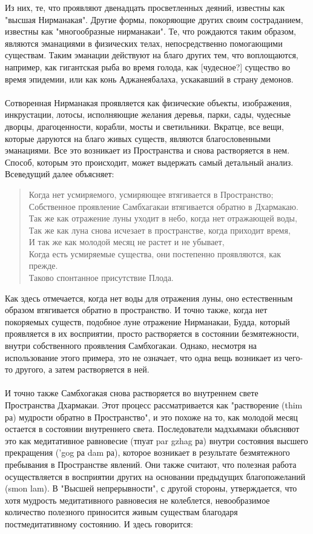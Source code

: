 Из них, те, что проявляют двенадцать просветленных деяний, известны как "высшая
Нирманакая". Другие формы, покоряющие других своим состраданием, известны как
"многообразные нирманакаи". Те, что рождаются таким образом, являются эманациями в
физических телах, непосредственно помогающими существам. Таким эманации действуют
на благо других тем, что воплощаются, например, как гигантская рыба во время голода, как
[чудесное?] существо во время эпидемии, или как конь Аджанеябалаха, ускакавший в страну
демонов.\\
\\
Сотворенная Нирманакая проявляется как физические объекты, изображения,
инкрустации, лотосы, исполняющие желания деревья, парки, сады, чудесные дворцы,
драгоценности, корабли, мосты и светильники. Вкратце, все вещи, которые даруются на
благо живых существ, являются благословенными эманациями. Все это возникает из
Пространства и снова растворяется в нем. Способ, которым это происходит, может
выдержать самый детальный анализ. Всеведущий далее объясняет:

\begin{verse}
Когда нет усмиряемого, усмиряющее втягивается в Пространство;\\
Собственное проявление Самбхагакаи втягивается обратно в Дхармакаю.\\
Так же как отражение луны уходит в небо, когда нет отражающей воды,\\
Так же как луна снова исчезает в пространстве, когда приходит время,\\
И так же как молодой месяц не растет и не убывает,\\
Когда есть усмиряемые существа, они постепенно проявляются, как прежде.\\
Таково спонтанное присутствие Плода.
\end{verse}

Как здесь отмечается, когда нет воды для отражения луны, оно естественным образом
втягивается обратно в пространство. И точно также, когда нет покоряемых существ,
подобное луне отражение Нирманакаи, Будда, который проявляется в их восприятии, просто
растворяется в состоянии безмятежности, внутри собственного проявления Самбхогакаи.
Однако, несмотря на использование этого примера, это не означает, что одна вещь возникает
из чего-то другого, а затем растворяется в ней.\\
\\
И точно также Самбхогакая снова растворяется во внутреннем свете Пространства
Дхармакаи. Этот процесс рассматривается как "растворение (thim ра) мудрости обратно в
Пространство", и это похоже на то, как молодой месяц остается в состоянии внутреннего
света. Последователи мадхьямаки объясняют это как медитативное равновесие (тпуат par
gzhag ра) внутри состояния высшего прекращения ('gog ра dam ра), которое возникает в
результате безмятежного пребывания в Пространстве явлений. Они также считают, что
полезная работа осуществляется в восприятии других на основании предыдущих
благопожеланий (smon lam). В "Высшей непрерывности", с другой стороны, утверждается,
что хотя мудрость медитативного равновесия не колеблется, невообразимое количество
полезного приносится живым существам благодаря постмедитативному состоянию. И здесь
говорится:

